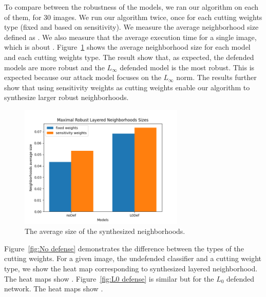 To compare between the robustness of the models, we ran our algorithm on each of them, for 30 images. We run our algorithm twice, once for each cutting weights type (fixed and based on sensitivity). We measure the average neighborhood size defined as . We also measure that the average execution time for a single image, which is about .
Figure~\ref{fig:neighborhoods_average_size} shows the average neighborhood size for each model and each cutting weights type.
The result show that, as expected, the defended models are more robust and the $L_{\infty}$ defended model is the most robust.
This is expected because our attack model focuses on the $L_{\infty}$ norm.
 The results further show that using sensitivity weights as cutting weights enable our algorithm to synthesize larger robust neighborhoods.
\begin{figure}
    \centering
    \includegraphics[width=0.7\textwidth]{neighborhoods_average_size.png}
    \caption{The average size of the synthesized neighborhoods.}
    \label{fig:neighborhoods_average_size}
\end{figure}
%
  Figure~\ref{fig:No defense} demonstrates the difference between the types of the cutting weights. For a given image, the undefended classifier and a cutting weight type, we show the heat map corresponding to synthesized layered neighborhood. The heat maps show .
  Figure~\ref{fig:L0 defense} is similar but for the $L_0$ defended network. The heat maps show .
